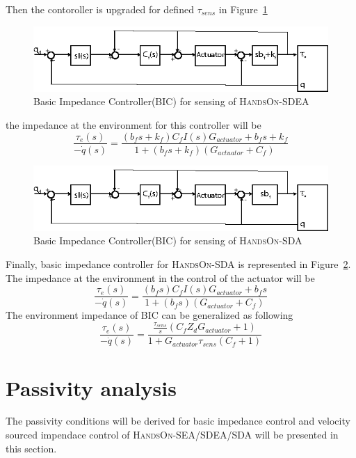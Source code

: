 \documentclass[a4paper,12pt]{article}
\begin{document}
Then the contoroller is upgraded for defined $\tau_{sens}$ in Figure~\ref{fig:model4}
\begin{figure}[h]
\centering
\includegraphics[scale=2]{bicv2.eps}
\caption{Basic Impedance Controller(BIC) for sensing of \textsc{HandsOn-SDEA}}
\label{fig:model4}
\end{figure}
the impedance at the environment for this controller will be
\begin{equation}
\frac{\tau_e(s)}{-\Dot{q}(s)}=\frac{(b_fs+k_f)C_fI(s)G_{actuator}+b_fs+k_f}{1+(b_fs+k_f)(G_{actuator}+C_f)}   
\end{equation}
\begin{figure}[h]
\centering
\includegraphics[scale=2]{bicv3.eps}
\caption{Basic Impedance Controller(BIC) for sensing of \textsc{HandsOn-SDA}}
\label{fig:model5}
\end{figure}
Finally, basic impedance controller for \textsc{HandsOn-SDA} is represented in Figure~\ref{fig:model5}. The impedance at the environment in the control of the actuator will be 
\begin{equation}
\frac{\tau_e(s)}{-\Dot{q}(s)}=\frac{(b_fs)C_fI(s)G_{actuator}+b_fs}{1+(b_fs)(G_{actuator}+C_f)}   
\end{equation}
The environment impedance of BIC can be generalized as following
\begin{equation}
\frac{\tau_e(s)}{-\Dot{q}(s)}=\frac{\frac{\tau_{sens}}{s}(C_fZ_{d}G_{actuator}+1)}{1+G_{actuator}\tau_{sens}(C_f+1)}   
\end{equation}
\newpage
\section{Passivity analysis}

The passivity conditions will be derived for basic impedance control and velocity sourced impendace control of \textsc{HandsOn-SEA/SDEA/SDA} will be presented in this section.\\
\end{document}
